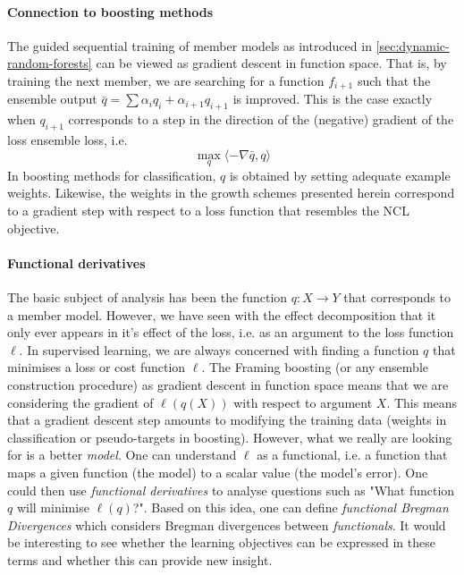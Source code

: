 \documentclass[
	twoside=false, %
]{kaobook}
\begin{document}
\paragraph{Connection to boosting methods} The guided sequential training of member models as introduced in \cref{sec:dynamic-random-forests} can be viewed as gradient descent in function space. That is, by training the next member, we are searching for a function $f_{i+1}$ such that the ensemble output $\bar{q} = \sum \alpha_i q_i + \alpha_{i+1} q_{i+1}$ is improved.
This is the case exactly when $q_{i+1}$ corresponds to a step in the direction of the (negative) gradient of the loss ensemble loss, i.e.
$$
\max_q  \langle - \nabla \bar{q}, q \rangle
$$
In boosting methods for classification, $q$ is obtained by setting adequate example weights. Likewise, the weights in the growth schemes presented herein correspond to a gradient step with respect to a loss function that resembles the NCL objective.


\paragraph{Functional derivatives} The basic subject of analysis has been the function $q: X \to Y$ that corresponds to a member model. However, we have seen with the effect decomposition that it only ever appears in it's effect of the loss, i.e. as an argument to the loss function $\ell$. In supervised learning, we are always concerned with finding a function $q$ that minimises a loss or cost function $\ell$. The 
Framing boosting (or any ensemble construction procedure) as gradient descent in function space means that we are considering the gradient of $\ell(q(X))$ with respect to argument $X$. This means that a gradient descent step amounts to modifying the training data (weights in classification or pseudo-targets in boosting). However, what we really are looking for is a better \textit{model}. One can understand $\ell$ as a functional, i.e. a function that maps a given function (the model) to a scalar value (the model's error). One could then use \textit{functional derivatives} 
\cite{frigyik_IntroductionFunctionalDerivatives_} to analyse questions such as "What function $q$ will minimise $\ell(q)$?". Based on this idea, one can define \textit{functional Bregman Divergences} \cite{frigyik_FunctionalBregmanDivergence_2008} which considers Bregman divergences between \textit{functionals}. It would be interesting to see whether the learning objectives can be expressed in these terms and whether this can provide new insight.
\end{document}
